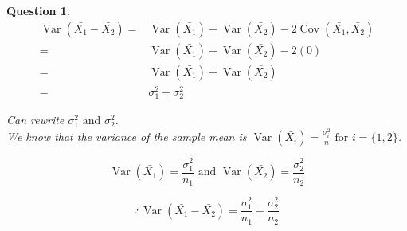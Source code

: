 \documentclass{article}
\theoremstyle{questionstyle}
\newtheorem{myquestion}{Question}
\begin{document}
\begin{myquestion}
\begin{align*}
    \operatorname{Var}(\bar{X_1} - \bar{X_2}) =& \operatorname{Var}(\bar{X_1}) + \operatorname{Var}(\bar{X_2}) - 2\operatorname{Cov}(\bar{X_1}, \bar{X_2})\\
    =& \operatorname{Var}(\bar{X_1}) + \operatorname{Var}(\bar{X_2}) - 2(0)\\
    =& \operatorname{Var}(\bar{X_1}) + \operatorname{Var}(\bar{X_2})\\
    =& \sigma_1^2 + \sigma_2^2
\end{align*}

Can rewrite \(\sigma_1^2 \text{ and } \sigma_2^2\).\\ 

We know that the variance of the sample mean is \(\operatorname{Var}(\bar{X_i}) = \frac{\sigma_i^2}{n} \text{ for } i = \{1,2\}\).

\[\operatorname{Var}(\bar{X_1}) = \frac{\sigma_1^2}{n_1} \text{ and }\operatorname{Var}(\bar{X_2}) = \frac{\sigma_2^2}{n_2}\]

\[\therefore \operatorname{Var}(\bar{X_1} - \bar{X_2}) =  \frac{\sigma_1^2}{n_1} +  \frac{\sigma_2^2}{n_2}\]


\end{myquestion} %
\end{document}
